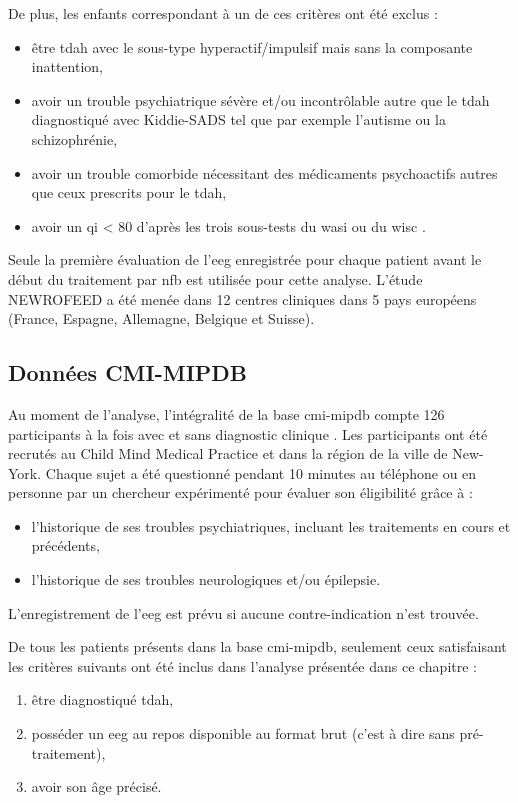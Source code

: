 De plus, les enfants correspondant à un de ces critères ont été exclus :
\begin{itemize}
\item être \gls{tdah} avec le sous-type hyperactif/impulsif mais sans la composante inattention,
\item avoir un trouble psychiatrique sévère et/ou incontrôlable autre que le \gls{tdah} diagnostiqué avec Kiddie-SADS tel que par 
exemple l'autisme ou la schizophrénie,
\item avoir un trouble comorbide nécessitant des médicaments psychoactifs autres que ceux prescrits pour le \gls{tdah},
\item avoir un \gls{qi} < 80 d'après les trois sous-tests du \gls{wasi} ou du \gls{wisc} \citep{Wechsler1999}.
\end{itemize}

Seule la première évaluation de l'\gls{eeg} enregistrée pour chaque patient avant le début du traitement par \gls{nfb} est utilisée pour cette analyse. 
L'étude NEWROFEED a été menée dans 12 centres cliniques dans 5 pays européens (France, Espagne, Allemagne, Belgique et Suisse).

\subsection{Données CMI-MIPDB}
Au moment de l'analyse, l'intégralité de la base \gls{cmi-mipdb} compte 126 participants à la fois avec et sans diagnostic clinique \citep{Langer2017, Langer2017b}.
Les participants ont été recrutés au Child Mind Medical Practice et dans la région de la ville de New-York. Chaque sujet a été questionné pendant 10 minutes
au téléphone ou en personne par un chercheur expérimenté pour évaluer son éligibilité grâce à :
\begin{itemize}
\item l'historique de ses troubles psychiatriques, incluant les traitements en cours et précédents,
\item l'historique de ses troubles neurologiques et/ou épilepsie.
\end{itemize}

L'enregistrement de l'\gls{eeg} est prévu si aucune contre-indication n'est trouvée. 

De tous les patients présents dans la base \gls{cmi-mipdb}, seulement ceux satisfaisant les critères suivants ont été inclus dans l'analyse présentée dans ce chapitre :
\begin{enumerate}
\item être diagnostiqué \gls{tdah},
\item posséder un \gls{eeg} au repos disponible au format brut (c'est à dire sans pré-traitement),
\item avoir son âge précisé.
\end{enumerate}


